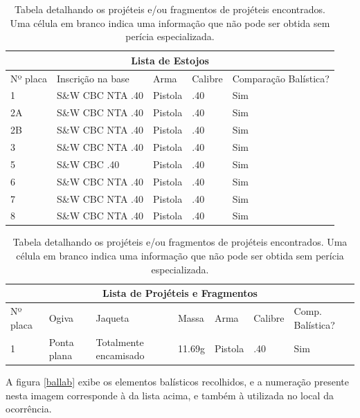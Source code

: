 \documentclass[a4paper,12pt,oneside]{article}
\newcommand{\fig}[3]{       %
	\begin{figure}[H]
		\centering
		\texttt{[image: \#1]}
		\settowidth{\imgwidth}{\texttt{[image: \#1]}}
		\captionsetup{width=\imgwidth}
		\caption{#2}
		\label{#3}
	\end{figure}
}
\newcommand{\f}[2]{\fig{#1.jpg}{#2}{#1}}
\newlength{\imgwidth}                     %
\newcounter{c}
\newcounter{d}
\newcounter{u}
\begin{document}
\vspace{18pt}
\begin{table}[H]
	\centering
	\begin{tabular}{ |p{1cm}||p{3.5cm}|p{2cm}|p{1.2cm}|p{3cm}|  }
		\hline
		\multicolumn{5}{|c|}{\textbf{Lista de Estojos}} \\
		\hline
		Nº placa & Inscrição na base & Arma & Calibre &  Comparação Balística?\\
		\hline
		\hline
		1 & S{\&}W CBC NTA .40 & Pistola & .40 & Sim\\
		\hline
		2A & S{\&}W CBC NTA .40 & Pistola & .40 & Sim\\
		\hline
		2B & S{\&}W CBC NTA .40 & Pistola & .40 & Sim\\
		\hline
		3 & S{\&}W CBC NTA .40 & Pistola & .40 & Sim\\
		\hline
		5 & S{\&}W CBC .40 & Pistola & .40 & Sim\\
		\hline
		6 & S{\&}W CBC NTA .40 & Pistola & .40 & Sim\\
		\hline
		7 & S{\&}W CBC NTA .40 & Pistola & .40 & Sim\\
		\hline
		8 & S{\&}W CBC NTA .40 & Pistola & .40 & Sim\\
		\hline
		\hline
	\end{tabular}
	\caption{Tabela detalhando os estojos encontrados.}
	\label{est_tab}

	\vspace{18pt}
	\begin{tabular}{ |p{1cm}||p{1.5cm}|p{2.5cm}|p{1.2cm}|p{1.2cm}| p{1.2cm} | p{2cm} |}
 		\hline
		\multicolumn{7}{|c|}{\textbf{Lista de Projéteis e Fragmentos}}\\
		\hline
		Nº placa & Ogiva & Jaqueta & Massa & Arma & Calibre & Comp. Balística?\\
		\hline
		\hline
		1 & Ponta plana & Totalmente encamisado & 11.69g & Pistola & .40 & Sim\\
		\hline
	\end{tabular}
	\caption{Tabela detalhando os projéteis e/ou fragmentos de projéteis encontrados. Uma célula em branco indica uma informação que não pode ser obtida sem perícia especializada.}
	\label{proj_tab}
\end{table}


A figura \ref{ballab} exibe os elementos balísticos recolhidos, e a numeração presente nesta imagem corresponde à da lista acima, e também à utilizada no local da ocorrência.

\end{document}
